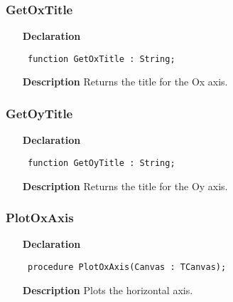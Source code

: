 \documentclass[12pt,a4paper,oneside]{report}
\newcommand{\declarationitem}[1]{\textbf{#1}}
\newcommand{\descriptiontitle}[1]{\textbf{#1}}
\newcommand{\code}[1]{\texttt{#1}}
\begin{document}
\subsubsection{GetOxTitle}
\label{uwinplot-GetOxTitle}
\begin{itemize}\item[\declarationitem{Declaration}\hfill]
	\begin{flushleft}
		\code{
			function GetOxTitle : String;}
		
	\end{flushleft}
	
	\par
	\item[\descriptiontitle{Description}]
	Returns the title for the Ox axis.
	
\end{itemize}
\subsubsection{GetOyTitle}
\label{uwinplot-GetOyTitle}
\begin{itemize}\item[\declarationitem{Declaration}\hfill]
	\begin{flushleft}
		\code{
			function GetOyTitle : String;}
		
	\end{flushleft}
	
	\par
	\item[\descriptiontitle{Description}]
	Returns the title for the Oy axis.
	
\end{itemize}
\subsubsection{PlotOxAxis}
\label{uwinplot-PlotOxAxis}
\begin{itemize}\item[\declarationitem{Declaration}\hfill]
	\begin{flushleft}
		\code{
			procedure PlotOxAxis(Canvas : TCanvas);}
		
	\end{flushleft}
	
	\par
	\item[\descriptiontitle{Description}]
	Plots the horizontal axis.
	
\end{itemize}
\end{document}
